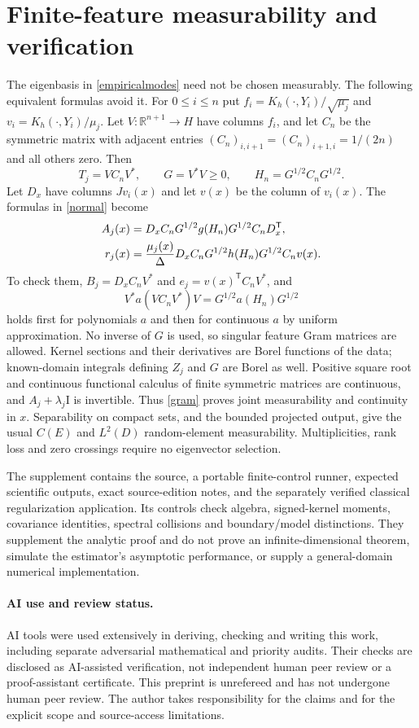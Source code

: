 \documentclass[11pt]{article}
\theoremstyle{remark}\newtheorem{remark}[theorem]{Remark}
\newcommand{\R}{\mathbb R}
\newcommand{\Id}{\mathrm I}
\newcommand{\tr}{\mathsf T}
\begin{document}
\section{Finite-feature measurability and verification}
The eigenbasis in \eqref{empiricalmodes} need not be chosen measurably. The
following equivalent formulas avoid it. For $0\leq i\leq n$ put
$f_i=K_h(\cdot,Y_i)/\sqrt{\mu_j}$ and
$v_i=K_h(\cdot,Y_i)/\mu_j$. Let $V:\R^{n+1}\to H$ have columns $f_i$,
and let $C_n$ be the symmetric matrix with adjacent entries
$(C_n)_{i,i+1}=(C_n)_{i+1,i}=1/(2n)$ and all others zero. Then
\[
 T_j=VC_nV^*,\qquad G=V^*V\geq0,\qquad H_n=G^{1/2}C_nG^{1/2}.
\]
Let $D_x$ have columns $Jv_i(x)$ and let $v(x)$ be the column of $v_i(x)$.
The formulas in \eqref{normal} become
\begin{align}
 A_j(x)&=D_xC_nG^{1/2}g(H_n)G^{1/2}C_nD_x^\tr,\label{gram}\\
 r_j(x)&=\frac{\mu_j(x)}{\Delta}
 D_xC_nG^{1/2}h(H_n)G^{1/2}C_nv(x).\notag
\end{align}
To check them, $B_j=D_xC_nV^*$ and $e_j=v(x)^\tr C_nV^*$, and
\[
 V^*a(VC_nV^*)V=G^{1/2}a(H_n)G^{1/2}
\]
holds first for polynomials $a$ and then for continuous $a$ by uniform
approximation. No inverse of $G$ is used, so singular feature Gram matrices
are allowed. Kernel sections and their derivatives are Borel functions of
the data; known-domain integrals defining $Z_j$ and $G$ are Borel as well.
Positive square root and continuous functional calculus of finite symmetric
matrices are continuous, and $A_j+\lambda_j\Id$ is invertible.
Thus \eqref{gram} proves joint measurability and continuity in $x$.
Separability on compact sets, and the bounded projected output, give the
usual $C(E)$ and $L^2(D)$ random-element measurability. Multiplicities,
rank loss and zero crossings require no eigenvector selection.

The supplement contains the source, a portable finite-control runner,
expected scientific outputs, exact source-edition notes, and the separately
verified classical regularization application. Its controls check algebra,
signed-kernel moments, covariance identities, spectral collisions and
boundary/model distinctions. They supplement the analytic proof and do not
prove an infinite-dimensional theorem, simulate the estimator's asymptotic
performance, or supply a general-domain numerical implementation.

\paragraph{AI use and review status.}
AI tools were used extensively in deriving, checking and writing this work,
including separate adversarial mathematical and priority audits. Their
checks are disclosed as AI-assisted verification, not independent human
peer review or a proof-assistant certificate. This preprint is unrefereed
and has not undergone human peer review. The author takes responsibility for
the claims and for the explicit scope and source-access limitations.
\end{document}
